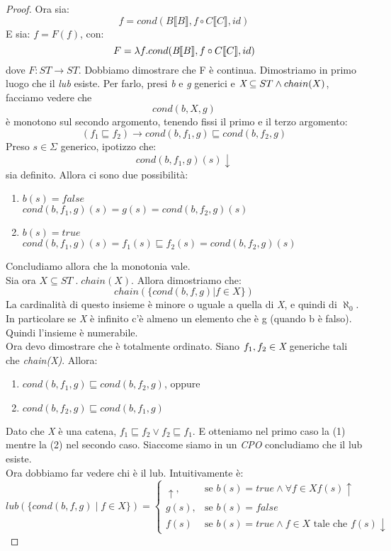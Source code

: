 \begin{proof}
  Ora sia:
  $$ f = cond(B \llbracket B \rrbracket , f \circ C \llbracket C \rrbracket , id) $$
  E sia:
  $ f = F(f) $, con:
  $$ F = \lambda f . cond(\emph{B} \llbracket B \rrbracket , f \circ C \llbracket C \rrbracket , id) $$
  dove $ F: ST \rightarrow ST $. Dobbiamo dimostrare che F è continua. Dimostriamo in primo luogo che il \emph{lub} esiste. Per farlo, presi \emph{b} e \emph{g} generici e $ \emph{X} \subseteq ST \land chain(X) $, facciamo vedere che $$ cond(b,X,g) $$ è monotono sul secondo argomento, tenendo fissi il primo e il terzo argomento:
  $$ (f_1 \sqsubseteq f_2) \rightarrow cond(b,f_{1},g) \sqsubseteq cond(b,f_{2},g) $$
  Preso $s \in \Sigma $ generico, ipotizzo che:
  $$ cond(b,f_1,g)(s) \downarrow $$
  sia definito. Allora ci sono due possibilità:
  \begin{enumerate}
  \item $ b(s) = false $ \\
    $ cond(b,f_1,g)(s)=g(s)=cond(b,f_2,g)(s) $
  \item $ b(s) = true $ \\
    $ cond(b,f_1,g)(s) = f_{1}(s) \sqsubseteq f_{2}(s) = cond(b,f_2,g)(s) $
  \end{enumerate}
  Concludiamo allora che la monotonia vale. \\
  Sia ora $ X \subseteq ST \; . \; chain(X) $. Allora dimostriamo che:
  $$ chain( \{cond(b,f,g) | f \in X\}) $$
  La cardinalità di questo insieme è minore o uguale a quella di \emph{X}, e quindi di $ \aleph_0 $. In particolare se \emph{X} è infinito c'è almeno un elemento che è g (quando b è falso). Quindi l'insieme è numerabile. \\ Ora devo dimostrare che è totalmente ordinato. Siano $f_1,f_2 \in \emph{X}$ generiche tali che \emph{chain(X)}. Allora:
  \begin{enumerate}
  \item $cond(b,f_1,g) \sqsubseteq cond(b,f_2,g)$, oppure
  \item $cond(b,f_2,g) \sqsubseteq cond(b,f_1,g)$
  \end{enumerate}
  Dato che \emph{X} è una catena, $f_1 \sqsubseteq f_2 \lor f_2 \sqsubseteq f_1 $. E otteniamo nel primo caso la (1) mentre la (2) nel secondo caso. Siaccome siamo in un \emph{CPO} concludiamo che il lub esiste. \\
  Ora dobbiamo far vedere chi è il lub. Intuitivamente è:
  $$ lub( \{ cond(b,f,g) \; | \; f \in X \})= \begin{cases} \uparrow , & \mbox{se } b(s)=true \land \forall f \in X f(s) \uparrow \; \\ g(s), & \mbox{se } b(s)=false \; \\ f(s) & \mbox{se } b(s)=true \land f \in X \mbox{ tale che } f(s) \downarrow

\end{cases}$$
\end{proof}
